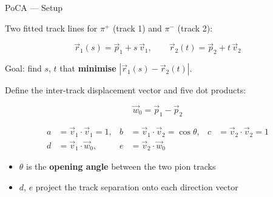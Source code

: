 \documentclass[aspectratio=169,10pt]{beamer}
\begin{document}
\begin{frame}{PoCA — Setup}

Two fitted track lines for $\pi^+$ (track 1) and $\pi^-$ (track 2):

\begin{equation*}
    \vec{r}_1(s) = \vec{p}_1 + s\,\vec{v}_1, \qquad
    \vec{r}_2(t) = \vec{p}_2 + t\,\vec{v}_2
\end{equation*}

Goal: find $s$, $t$ that \textbf{minimise} $|\vec{r}_1(s) - \vec{r}_2(t)|$.

\medskip
Define the inter-track displacement vector and five dot products:

\begin{equation*}
    \vec{w}_0 = \vec{p}_1 - \vec{p}_2
\end{equation*}

\begin{align*}
    a &= \vec{v}_1 \cdot \vec{v}_1 = 1, &
    b &= \vec{v}_1 \cdot \vec{v}_2 = \cos\theta, &
    c &= \vec{v}_2 \cdot \vec{v}_2 = 1 \\
    d &= \vec{v}_1 \cdot \vec{w}_0, &
    e &= \vec{v}_2 \cdot \vec{w}_0 & &
\end{align*}

\begin{itemize}
    \item $\theta$ is the \textbf{opening angle} between the two pion tracks
    \item $d$, $e$ project the track separation onto each direction vector
\end{itemize}

\end{frame}
\end{document}

